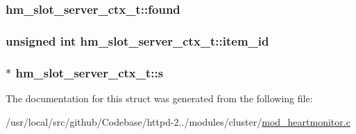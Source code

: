 \subsubsection[{\texorpdfstring{found}{found}}]{ hm\+\_\+slot\+\_\+server\+\_\+ctx\+\_\+t\+::found}\hypertarget{structhm__slot__server__ctx__t_a6766dc2be33ea8df718cf16c992150ca}{}\label{structhm__slot__server__ctx__t_a6766dc2be33ea8df718cf16c992150ca}
\subsubsection[{\texorpdfstring{item\+\_\+id}{item_id}}]{\setlength{\rightskip}{0pt plus 5cm}unsigned {\bf int} hm\+\_\+slot\+\_\+server\+\_\+ctx\+\_\+t\+::item\+\_\+id}\hypertarget{structhm__slot__server__ctx__t_a778fe1ff6ffe8b45edaccf4aacd70baa}{}\label{structhm__slot__server__ctx__t_a778fe1ff6ffe8b45edaccf4aacd70baa}
\subsubsection[{\texorpdfstring{s}{s}}]{$\ast$ hm\+\_\+slot\+\_\+server\+\_\+ctx\+\_\+t\+::s}\hypertarget{structhm__slot__server__ctx__t_ad3d0eb1204810463c38c678d93d12618}{}\label{structhm__slot__server__ctx__t_ad3d0eb1204810463c38c678d93d12618}


The documentation for this struct was generated from the following file\+:\begin{DoxyCompactItemize}
\item 
/usr/local/src/github/\+Codebase/httpd-\/2../modules/cluster/\hyperlink{mod__heartmonitor_8c}{mod\+\_\+heartmonitor.\+c}\end{DoxyCompactItemize}
